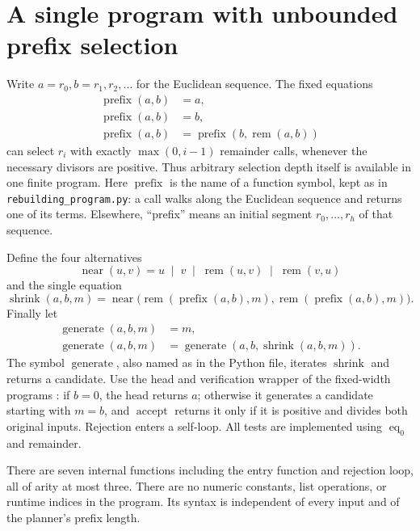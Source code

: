 \documentclass[11pt]{article}
\newcommand{\rem}{\operatorname{rem}}
\newcommand{\eq}{\operatorname{eq}}
\begin{document}
\section{A single program with unbounded prefix selection}\label{sec:single}

Write $a=r_0,b=r_1,r_2,\ldots$ for the Euclidean sequence. The fixed equations
\begin{align*}
\operatorname{prefix}(a,b)&=a,\\
\operatorname{prefix}(a,b)&=b,\\
\operatorname{prefix}(a,b)&=\operatorname{prefix}(b,\rem(a,b))
\end{align*}
can select $r_i$ with exactly $\max(0,i-1)$ remainder calls, whenever the
necessary divisors are positive. Thus arbitrary selection depth itself is
available in one finite program. Here $\operatorname{prefix}$ is the name of a
function symbol, kept as in \texttt{rebuilding\_program.py}: a call walks
along the Euclidean sequence and returns one of its terms. Elsewhere,
``prefix'' means an initial segment $r_0,\ldots,r_h$ of that sequence.

Define the four alternatives
\[
\operatorname{near}(u,v)=u\;\mid\;v\;\mid\;\rem(u,v)\;\mid\;\rem(v,u)
\]
and the single equation
\[
\operatorname{shrink}(a,b,m)=\operatorname{near}
 \bigl(\rem(\operatorname{prefix}(a,b),m),
       \rem(\operatorname{prefix}(a,b),m)\bigr).
\]
Finally let
\begin{align*}
\operatorname{generate}(a,b,m)&=m,\\
\operatorname{generate}(a,b,m)&=
 \operatorname{generate}(a,b,\operatorname{shrink}(a,b,m)).
\end{align*}
The symbol $\operatorname{generate}$, also named as in the Python file,
iterates $\operatorname{shrink}$ and returns a candidate.
Use the head and verification wrapper of the fixed-width programs
\cite{nondet}: if $b=0$, the head returns $a$; otherwise it generates a
candidate starting with $m=b$, and $\operatorname{accept}$ returns it only if
it is positive and divides both original inputs. Rejection enters a self-loop. All tests
are implemented using $\eq_0$ and remainder.

There are seven internal functions including the entry function and rejection
loop, all of arity at most three. There are no numeric constants, list
operations, or runtime indices in the program. Its syntax is independent of
every input and of the planner's prefix length.
\end{document}
